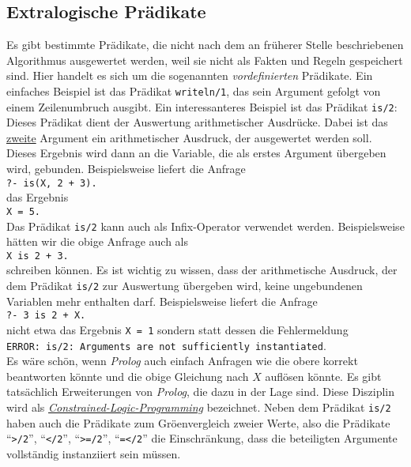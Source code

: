 \subsection{Extralogische Pr\"{a}dikate}
Es gibt bestimmte Pr\"{a}dikate, die nicht nach dem an fr\"{u}herer Stelle beschriebenen Algorithmus
ausgewertet werden, weil sie nicht als Fakten und Regeln gespeichert sind.  Hier handelt es sich um
die sogenannten \emph{vordefinierten} Pr\"{a}dikate.  Ein einfaches Beispiel ist das Pr\"{a}dikat
\texttt{writeln/1}, das sein Argument gefolgt von einem Zeilenumbruch ausgibt.  Ein interessanteres
Beispiel ist das Pr\"{a}dikat \texttt{is/2}: Dieses Pr\"{a}dikat dient der Auswertung arithmetischer
Ausdr\"{u}cke.  Dabei ist das \underline{zweite} Argument ein arithmetischer Ausdruck, der ausgewertet
werden soll.  Dieses Ergebnis wird dann an die Variable, die als erstes Argument \"{u}bergeben wird,
gebunden.  Beispielsweise liefert die Anfrage
\\[0.2cm]
\hspace*{1.3cm}
\texttt{?- is(X, 2 + 3).}
\\[0.2cm]
das Ergebnis
\\[0.2cm]
\hspace*{1.3cm}
\texttt{X = 5.}
\\[0.2cm]
Das Pr\"{a}dikat \texttt{is/2} kann auch als Infix-Operator verwendet werden.  Beispielsweise h\"{a}tten wir
die obige Anfrage auch als
\\[0.2cm]
\hspace*{1.3cm}
\texttt{X is 2 + 3.}
\\[0.2cm]
schreiben k\"{o}nnen.  Es ist wichtig zu wissen, dass der arithmetische Ausdruck, der dem Pr\"{a}dikat
\texttt{is/2} zur Auswertung \"{u}bergeben wird, keine ungebundenen Variablen mehr enthalten darf.
Beispielsweise liefert die Anfrage
\\[0.2cm]
\hspace*{1.3cm}
\texttt{?- 3 is 2 + X.}
\\[0.2cm]
nicht etwa das Ergebnis \texttt{X = 1} sondern statt dessen die Fehlermeldung
\\[0.2cm]
\hspace*{1.3cm}
\texttt{ERROR: is/2: Arguments are not sufficiently instantiated}.
\\[0.2cm]
Es w\"{a}re sch\"{o}n, wenn \textsl{Prolog} auch einfach Anfragen wie die obere korrekt beantworten k\"{o}nnte
und die obige Gleichung nach $X$ aufl\"{o}sen k\"{o}nnte.  Es gibt tats\"{a}chlich Erweiterungen von
\textsl{Prolog}, die dazu in der Lage sind.  Diese Disziplin wird als
\href{http://en.wikipedia.org/wiki/Constraint_logic_programming}{\emph{Constrained-Logic-Programming}} bezeichnet.
Neben dem Pr\"{a}dikat \texttt{is/2} haben auch die Pr\"{a}dikate zum Gr\"{o}\3envergleich zweier Werte, also die
Pr\"{a}dikate ``\texttt{>/2}'', ``\texttt{</2}'', ``\texttt{>=/2}'', ``\texttt{=</2}'' die
Einschr\"{a}nkung, dass die beteiligten Argumente vollst\"{a}ndig instanziiert sein m\"{u}ssen.

